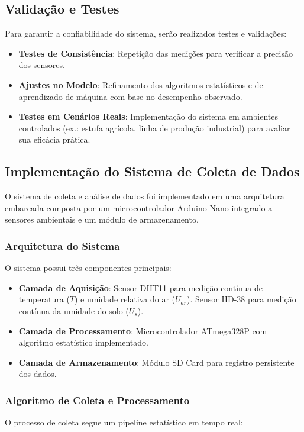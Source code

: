 \documentclass[12pt, a4paper]{article}
\begin{document}
\subsection{Validação e Testes}
Para garantir a confiabilidade do sistema, serão realizados testes e validações:
\begin{itemize}
    \item \textbf{Testes de Consistência}: Repetição das medições para verificar a precisão dos sensores.
    \item \textbf{Ajustes no Modelo}: Refinamento dos algoritmos estatísticos e de aprendizado de máquina com base no desempenho observado.
    \item \textbf{Testes em Cenários Reais}: Implementação do sistema em ambientes controlados (ex.: estufa agrícola, linha de produção industrial) para avaliar sua eficácia prática.
\end{itemize}

\subsection{Implementação do Sistema de Coleta de Dados}
\label{sec:implementacao}

O sistema de coleta e análise de dados foi implementado em uma arquitetura embarcada composta por um microcontrolador Arduino Nano integrado a sensores ambientais e um módulo de armazenamento. 

\subsubsection{Arquitetura do Sistema}
O sistema possui três componentes principais:

\begin{itemize}
    \item \textbf{Camada de Aquisição}: Sensor DHT11 para medição contínua de temperatura ($T$) e umidade relativa do ar ($U_{ar}$). Sensor HD-38 para medição contínua da umidade do solo ($U_s$). 
    \item \textbf{Camada de Processamento}: Microcontrolador ATmega328P com algoritmo estatístico implementado.
    \item \textbf{Camada de Armazenamento}: Módulo SD Card para registro persistente dos dados.
\end{itemize}

\subsubsection{Algoritmo de Coleta e Processamento}
O processo de coleta segue um pipeline estatístico em tempo real:
\end{document}
